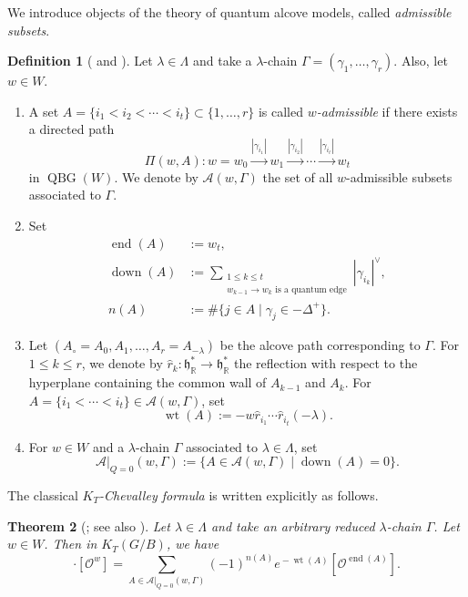 \documentclass[a4paper, 11pt, reqno]{amsart}
\numberwithin{equation}{section}
\newcommand{\BR}{\mathbb{R}}
\newcommand{\CA}{\mathcal{A}}
\newcommand{\CO}{\mathcal{O}}
\newcommand{\Fh}{\mathfrak{h}}
\newcommand{\wh}[1]{\widehat{#1}}
\DeclareMathOperator{\ed}{end}
\DeclareMathOperator{\down}{down}
\DeclareMathOperator{\wt}{wt}
\DeclareMathOperator{\QBG}{QBG}
\theoremstyle{plain}
\newtheorem{thm}{Theorem}[section]
\theoremstyle{definition}
\newtheorem{defn}[thm]{Definition}
\theoremstyle{remark}
\newenvironment{enu}{%
\begin{enumerate}[label=\textup{(\arabic*)}, left=0pt]}{%
\end{enumerate}}
\begin{document}
We introduce objects of the theory of quantum alcove models, called \emph{admissible subsets}. 

\begin{defn}[{\cite[Definition~3.4]{LL} and \cite[Definition~17]{LNS}}]
Let $\lambda \in \Lambda$ and take a $\lambda$-chain $\Gamma = (\gamma_{1}, \ldots, \gamma_{r})$. Also, let $w \in W$. 
\begin{enu}
\item A set $A = \{ i_{1} < i_{2} < \cdots < i_{t} \} \subset \{1, \ldots, r\}$ is called \emph{$w$-admissible} if there exists a directed path 
\begin{equation}
\Pi(w, A): w = w_{0} \xrightarrow{|\gamma_{i_{1}}|} w_{1} \xrightarrow{|\gamma_{i_{2}}|} \cdots \xrightarrow{|\gamma_{i_{t}}|} w_{t} 
\end{equation}
in $\QBG(W)$. 
We denote by $\CA(w, \Gamma)$ the set of all $w$-admissible subsets associated to $\Gamma$. 

\item Set 
\begin{align}
\ed(A) &:= w_{t}, \\ 
\down(A) &:= \sum_{\substack{1 \le k \le t \\ \text{$w_{k-1} \rightarrow w_{k}$ is a quantum edge}}} |\gamma_{i_{k}}|^{\vee}, \\ 
n(A) &:= \# \{ j \in A \mid \gamma_{j} \in -\Delta^{+} \}. 
\end{align}
\item Let $(A_{\circ} = A_{0}, A_{1}, \ldots, A_{r} = A_{-\lambda})$ be the alcove path corresponding to $\Gamma$. For $1 \le k \le r$, we denote by $\wh{r}_{k}: \Fh_{\BR}^{\ast} \rightarrow \Fh_{\BR}^{\ast}$ the reflection with respect to the hyperplane containing the common wall of $A_{k-1}$ and $A_{k}$. For $A = \{i_{1} < \cdots < i_{t}\} \in \CA(w, \Gamma)$, set 
\begin{equation}
\wt(A) := -w\wh{r}_{i_{1}} \cdots \wh{r}_{i_{t}} (-\lambda). 
\end{equation}

\item For $w \in W$ and a $\lambda$-chain $\Gamma$ associated to $\lambda \in \Lambda$, set 
\begin{equation}
\CA|_{Q=0}(w, \Gamma) := \{ A \in \CA(w, \Gamma) \mid \down(A) = 0 \}. 
\end{equation}
\end{enu}
\end{defn}

The classical \emph{$K_{T}$-Chevalley formula} is written explicitly as follows. 
\begin{thm}[{\cite[Theorem~6.1]{LP}; see also \cite[Remark~4.9]{Kouno}}] \label{thm:Chevalley}
Let $\lambda \in \Lambda$ and take an arbitrary reduced $\lambda$-chain $\Gamma$. 
Let $w \in W$. 
Then in $K_{T}(G/B)$, we have 
\begin{equation}
[\CO(\lambda)] \cdot [\CO^{w}] = \sum_{A \in \CA|_{Q=0}(w, \Gamma)} (-1)^{n(A)} e^{{}-\wt(A)} [\CO^{\ed(A)}]. 
\end{equation}
\end{thm}
\end{document}
